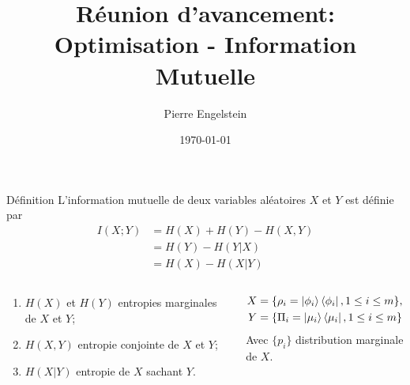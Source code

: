 \documentclass{beamer}
\begin{document}
\title{Réunion d'avancement: Optimisation - Information Mutuelle}
\author{Pierre Engelstein}
\date{\today}

\begin{frame}[plain]
    \maketitle
\end{frame}

\begin{frame}
    \begin{block}{Définition}
        L'information mutuelle de deux variables aléatoires $X$ et $Y$ est définie par
        \begin{align}
            I(X; Y) &= H(X) + H(Y) - H(X, Y) \\
            &= H(Y) - H(Y | X) \\
            &= H(X) - H(X | Y)
        \end{align}

        \begin{columns}
            \begin{column}{0.5\textwidth}
                \tiny
                \begin{enumerate}
                    \item $H(X)$ et $H(Y)$ entropies marginales de $X$ et $Y$; 
                    \item $H(X, Y)$ entropie conjointe de $X$ et $Y$;
                    \item $H(X|Y)$ entropie de $X$ sachant $Y$.
                \end{enumerate}
            \end{column}
            \begin{column}{0.5\textwidth}
                \tiny
                \begin{align*}
                    X &= \{ \rho_i = \ket{\phi_i}\bra{\phi_i}, 1 \leq i \leq m\}, \nonumber\\
                    Y &= \{ \Pi_i  = \ket{\mu_i}\bra{\mu_i}, 1 \leq i \leq m\} \nonumber
                \end{align*}
                Avec $\{p_i\}$ distribution marginale de $X$.
            \end{column}
        \end{columns}

    \end{block}
\end{frame}
\end{document}
